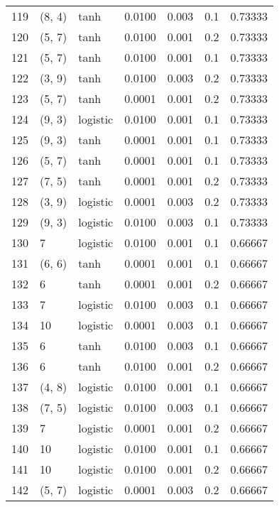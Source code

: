 \begin{tabular}{lllrrrr}
119 &      (8, 4) &      tanh &  0.0100 &  0.003 &  0.1 &   0.73333 \\
120 &      (5, 7) &      tanh &  0.0100 &  0.001 &  0.2 &   0.73333 \\
121 &      (5, 7) &      tanh &  0.0100 &  0.001 &  0.1 &   0.73333 \\
122 &      (3, 9) &      tanh &  0.0100 &  0.003 &  0.2 &   0.73333 \\
123 &      (5, 7) &      tanh &  0.0001 &  0.001 &  0.2 &   0.73333 \\
124 &      (9, 3) &  logistic &  0.0100 &  0.001 &  0.1 &   0.73333 \\
125 &      (9, 3) &      tanh &  0.0001 &  0.001 &  0.1 &   0.73333 \\
126 &      (5, 7) &      tanh &  0.0001 &  0.001 &  0.1 &   0.73333 \\
127 &      (7, 5) &      tanh &  0.0001 &  0.001 &  0.2 &   0.73333 \\
128 &      (3, 9) &  logistic &  0.0001 &  0.003 &  0.2 &   0.73333 \\
129 &      (9, 3) &  logistic &  0.0100 &  0.003 &  0.1 &   0.73333 \\
130 &           7 &  logistic &  0.0100 &  0.001 &  0.1 &   0.66667 \\
131 &      (6, 6) &      tanh &  0.0001 &  0.001 &  0.1 &   0.66667 \\
132 &           6 &      tanh &  0.0001 &  0.001 &  0.2 &   0.66667 \\
133 &           7 &  logistic &  0.0100 &  0.003 &  0.1 &   0.66667 \\
134 &          10 &  logistic &  0.0001 &  0.003 &  0.1 &   0.66667 \\
135 &           6 &      tanh &  0.0100 &  0.003 &  0.1 &   0.66667 \\
136 &           6 &      tanh &  0.0100 &  0.001 &  0.2 &   0.66667 \\
137 &      (4, 8) &  logistic &  0.0100 &  0.001 &  0.1 &   0.66667 \\
138 &      (7, 5) &  logistic &  0.0100 &  0.003 &  0.1 &   0.66667 \\
139 &           7 &  logistic &  0.0001 &  0.001 &  0.2 &   0.66667 \\
140 &          10 &  logistic &  0.0100 &  0.001 &  0.1 &   0.66667 \\
141 &          10 &  logistic &  0.0100 &  0.001 &  0.2 &   0.66667 \\
142 &      (5, 7) &  logistic &  0.0001 &  0.003 &  0.2 &   0.66667 \\

\end{tabular}
